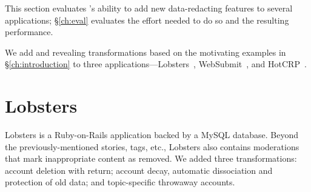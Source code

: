 This section evaluates \sys's ability to add new data-redacting features to
several applications; \S\ref{ch:eval} evaluates the effort needed to do so and the
resulting performance.
%

%
We add \xxing and revealing transformations based on
the motivating examples in \S\ref{ch:introduction}
to three applications---Lobsters~\cite{lobsters},
WebSubmit~\cite{websubmit-rs},
and HotCRP~\cite{hotcrp}.
%
%
%


\section{Lobsters}
\label{s:cs:lobsters}

%
Lobsters is a Ruby-on-Rails application backed by a MySQL database.
%
Beyond the previously-mentioned stories, tags, etc., Lobsters also contains
moderations that mark inappropriate content as removed.
%
We added three \xxing transformations: account deletion with return; account
decay, \ie automatic dissociation and protection of old data; and topic-specific
throwaway accounts.
%

